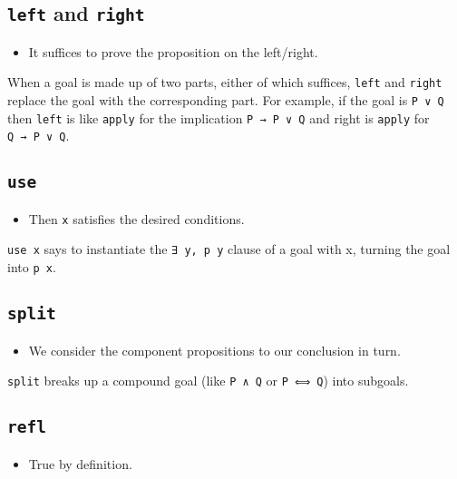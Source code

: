 \hypertarget{left-and-right}{%
\subsection{\texorpdfstring{\texttt{left} and
\texttt{right}}{left and right}}\label{left-and-right}}

\begin{itemize}
\tightlist
\item
  It suffices to prove the proposition on the left/right.
\end{itemize}

When a goal is made up of two parts, either of which suffices,
\texttt{left} and \texttt{right} replace the goal with the corresponding
part. For example, if the goal is \texttt{P\ ∨\ Q} then \texttt{left} is
like \texttt{apply} for the implication \texttt{P\ →\ P\ ∨\ Q} and right
is \texttt{apply} for \texttt{Q\ →\ P\ ∨\ Q}.

\hypertarget{use}{%
\subsection{\texorpdfstring{\texttt{use}}{use}}\label{use}}

\begin{itemize}
\tightlist
\item
  Then \texttt{x} satisfies the desired conditions.
\end{itemize}

\texttt{use\ x} says to instantiate the \texttt{∃\ y,\ p\ y} clause of a
goal with x, turning the goal into \texttt{p\ x}.

\hypertarget{split}{%
\subsection{\texorpdfstring{\texttt{split}}{split}}\label{split}}

\begin{itemize}
\tightlist
\item
  We consider the component propositions to our conclusion in turn.
\end{itemize}

\texttt{split} breaks up a compound goal (like \texttt{P\ ∧\ Q} or
\texttt{P\ ⟺\ Q}) into subgoals.

\hypertarget{refl}{%
\subsection{\texorpdfstring{\texttt{refl}}{refl}}\label{refl}}

\begin{itemize}
\tightlist
\item
  True by definition.
\end{itemize}
